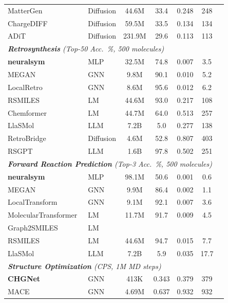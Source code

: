 \documentclass{article}
\theoremstyle{plain}
\theoremstyle{definition}
\theoremstyle{remark}
\begin{document}
\begin{table}[t]
\begin{tabular}{llccccc}
MatterGen~\cite{zeni2025generative} & Diffusion & 44.6M & 33.4 & 0.248 & 248 \\
ChargeDIFF~\cite{chargediff2024neurips} & Diffusion & 59.5M & 33.5 & 0.134 & 134 \\
ADiT~\cite{adit2025icml} & Diffusion & 231.9M & 29.6 & 0.113 & 113 \\
\midrule
\multicolumn{6}{l}{\textit{\textbf{Retrosynthesis} (Top-50 Acc.\ \%, 500 molecules)}} \\
\textbf{neuralsym}~\cite{segler2017neural} & MLP & 32.5M & 74.8 & 0.007 & 3.5 \\
MEGAN~\cite{megan2021jcim} & GNN & 9.8M & 90.1 & 0.010 & 5.2 \\
LocalRetro~\cite{chen2021deep} & GNN & 8.6M & 95.6 & 0.012 & 6.2 \\
RSMILES~\cite{zhong2022root} & LM & 44.6M & 93.0 & 0.217 & 108 \\
Chemformer~\cite{irwin2022chemformer} & LM & 44.7M & 64.0 & 0.513 & 257 \\
LlaSMol~\cite{yu2024llasmol} & LLM & 7.2B & 5.0 & 0.277 & 138 \\
RetroBridge~\cite{igashov2023retrobridge} & Diffusion & 4.6M & 52.8 & 0.807 & 403 \\
RSGPT~\cite{deng2025rsgpt} & LLM & 1.6B & 97.8 & 0.502 & 251 \\
\midrule
\multicolumn{6}{l}{\textit{\textbf{Forward Reaction Prediction} (Top-3 Acc.\ \%, 500 molecules)}} \\
\textbf{neuralsym}~\cite{segler2017neural} & MLP & 98.1M & 50.6 & 0.001 & 0.6 \\
MEGAN~\cite{megan2021jcim} & GNN & 9.9M & 86.4 & 0.002 & 1.1 \\
LocalTransform~\cite{chen2022generalized} & GNN & 9.1M & 92.1 & 0.007 & 3.6 \\
MolecularTransformer~\cite{schwaller2019molecular} & LM & 11.7M & 91.7 & 0.009 & 4.5 \\
Graph2SMILES~\cite{tu2022permutation} & LM & \todo{} & \todo{} & \todo{} & \todo{} \\
RSMILES~\cite{zhong2022root} & LM & 44.6M & 94.7 & 0.015 & 7.7 \\
LlaSMol~\cite{yu2024llasmol} & LLM & 7.2B & 5.9 & 0.035 & 17.7 \\
\midrule
\multicolumn{6}{l}{\textit{\textbf{Structure Optimization} (CPS, 1M MD steps)}} \\
\textbf{CHGNet}~\cite{deng2023chgnet} & GNN & 413K & 0.343 & 0.379 & 379 \\
MACE~\cite{batatia2022mace} & GNN & 4.69M & 0.637 & 0.932 & 932 \\

\end{tabular}
\end{table}
\end{document}
